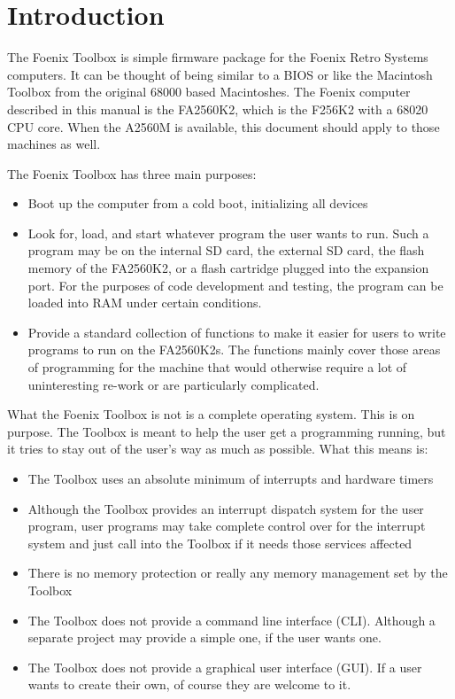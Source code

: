 \chapter{Introduction}

The Foenix Toolbox is simple firmware package for the Foenix Retro Systems computers. It can be thought of being similar to a BIOS or like the Macintosh Toolbox from the original 68000 based Macintoshes. The Foenix computer described in this manual is the FA2560K2, which is the F256K2 with a 68020 CPU core. When the A2560M is available, this document should apply to those machines as well.

The Foenix Toolbox has three main purposes:
\begin{itemize}
	\item Boot up the computer from a cold boot, initializing all devices
	\item Look for, load, and start whatever program the user wants to run. Such a program may be on the internal SD card, the external SD card, the flash memory of the FA2560K2, or a flash cartridge plugged into the expansion port. For the purposes of code development and testing, the program can be loaded into RAM under certain conditions.
	\item Provide a standard collection of functions to make it easier for users to write programs to run on the FA2560K2s. The functions mainly cover those areas of programming for the machine that would otherwise require a lot of uninteresting re-work or are particularly complicated.
\end{itemize}

What the Foenix Toolbox is not is a complete operating system. This is on purpose. The Toolbox is meant to help the user get a programming running, but it tries to stay out of the user's way as much as possible. What this means is:
\begin{itemize}
	\item The Toolbox uses an absolute minimum of interrupts and hardware timers
	\item Although the Toolbox provides an interrupt dispatch system for the user program, user programs may take complete control over for the interrupt system and just call into the Toolbox if it needs those services affected
	\item There is no memory protection or really any memory management set by the Toolbox
	\item The Toolbox does not provide a command line interface (CLI). Although a separate project may provide a simple one, if the user wants one.
	\item The Toolbox does not provide a graphical user interface (GUI). If a user wants to create their own, of course they are welcome to it.
\end{itemize}

